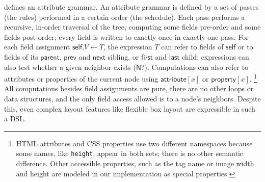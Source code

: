 defines an attribute grammar.
An attribute grammar is defined by
  a set of passes (the rules)
  performed in a certain order (the schedule).
Each pass performs a recursive, in-order traversal of the tree,
  computing some fields pre-order and some fields post-order;
  every field is written to exactly once in exactly one pass.
For each field assignment $\mathsf{self}.V \gets T$,
  the expression $T$ can refer
  to fields of $\mathsf{self}$ or
  to fields of its $\mathsf{parent}$,
  $\mathsf{prev}$ and $\mathsf{next}$ sibling,
  or $\mathsf{first}$ and $\mathsf{last}$ child;
  expressions can also test whether a given neighbor
  exists ($\mathsf{N?}$).
Computations can also refer to
  attributes or properties of the current node
  using $\mathsf{attribute}[x]$ or $\mathsf{property}[x]$.%
\footnote{
HTML attributes and CSS properties
  use two different namespaces
  because some names, like \texttt{height},
  appear in both sets; there is no other semantic difference.
Other accessible properties,
  such as the tag name or image width and height
  are modeled in our implementation as special properties.
}
All computations besides field assignments are pure,
  there are no other loops or data structures,
  and the only field access allowed is to a node's neighbors.
Despite this, even complex layout features
  like flexible box layout are expressible in such a DSL.

